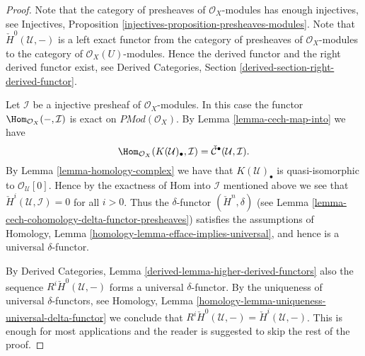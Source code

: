 \begin{proof}
Note that the category of presheaves of $\mathcal{O}_X$-modules
has enough injectives, see
Injectives, Proposition \ref{injectives-proposition-presheaves-modules}.
Note that $\check{H}^0(\mathcal{U}, -)$ is a left exact functor
from the category of presheaves of $\mathcal{O}_X$-modules
to the category of $\mathcal{O}_X(U)$-modules.
Hence the derived functor and the right derived functor exist, see
Derived Categories, Section \ref{derived-section-right-derived-functor}.

\medskip\noindent
Let $\mathcal{I}$ be a injective presheaf of $\mathcal{O}_X$-modules.
In this case the functor $\Hom_{\mathcal{O}_X}(-, \mathcal{I})$
is exact on $\textit{PMod}(\mathcal{O}_X)$. By
Lemma \ref{lemma-cech-map-into} we have
$$
\Hom_{\mathcal{O}_X}(K(\mathcal{U})_\bullet, \mathcal{I})
=
\check{\mathcal{C}}^\bullet(\mathcal{U}, \mathcal{I}).
$$
By Lemma \ref{lemma-homology-complex} we have that $K(\mathcal{U})_\bullet$ is
quasi-isomorphic to $\mathcal{O}_\mathcal{U}[0]$. Hence by
the exactness of Hom into $\mathcal{I}$ mentioned above we see
that $\check{H}^i(\mathcal{U}, \mathcal{I}) = 0$ for all
$i > 0$. Thus the $\delta$-functor $(\check{H}^n, \delta)$
(see Lemma \ref{lemma-cech-cohomology-delta-functor-presheaves})
satisfies the assumptions of
Homology, Lemma \ref{homology-lemma-efface-implies-universal},
and hence is a universal $\delta$-functor.

\medskip\noindent
By
Derived Categories, Lemma \ref{derived-lemma-higher-derived-functors}
also the sequence $R^i\check{H}^0(\mathcal{U}, -)$
forms a universal $\delta$-functor. By the uniqueness of universal
$\delta$-functors, see
Homology, Lemma \ref{homology-lemma-uniqueness-universal-delta-functor}
we conclude that
$R^i\check{H}^0(\mathcal{U}, -) = \check{H}^i(\mathcal{U}, -)$.
This is enough for most applications
and the reader is suggested to skip the rest of the proof.


\end{proof}
